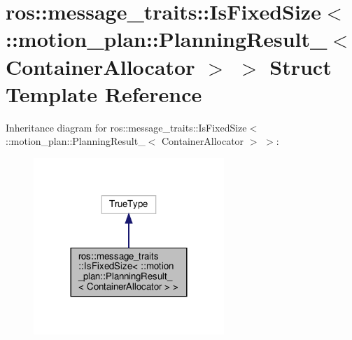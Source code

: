 \hypertarget{structros_1_1message__traits_1_1IsFixedSize_3_01_1_1motion__plan_1_1PlanningResult___3_01ContainerAllocator_01_4_01_4}{}\section{ros\+:\+:message\+\_\+traits\+:\+:Is\+Fixed\+Size$<$ \+:\+:motion\+\_\+plan\+:\+:Planning\+Result\+\_\+$<$ Container\+Allocator $>$ $>$ Struct Template Reference}
\label{structros_1_1message__traits_1_1IsFixedSize_3_01_1_1motion__plan_1_1PlanningResult___3_01ContainerAllocator_01_4_01_4}


Inheritance diagram for ros\+:\+:message\+\_\+traits\+:\+:Is\+Fixed\+Size$<$ \+:\+:motion\+\_\+plan\+:\+:Planning\+Result\+\_\+$<$ Container\+Allocator $>$ $>$\+:
\nopagebreak
\begin{figure}[H]
\begin{center}
\leavevmode
\includegraphics[width=204pt]{structros_1_1message__traits_1_1IsFixedSize_3_01_1_1motion__plan_1_1PlanningResult___3_01Containc289aa0b77d1ff6c42af5f5a4bc28674}
\end{center}
\end{figure}


